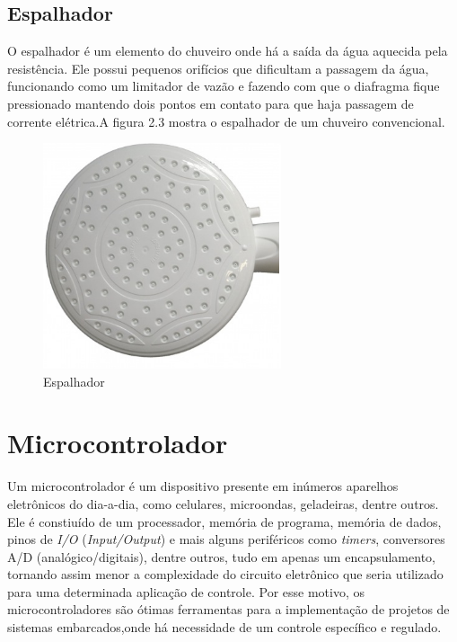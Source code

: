 \subsection{Espalhador}

O espalhador é um elemento do chuveiro onde há a saída da água aquecida pela resistência. Ele possui pequenos orifícios que dificultam a passagem da água, funcionando como um limitador de vazão e fazendo com que o diafragma fique pressionado mantendo dois pontos em contato para que haja passagem de corrente elétrica.A figura 2.3 mostra o espalhador de um chuveiro convencional.


\begin{figure}[!htb]

\center

\includegraphics[width=7cm]{imagens/espalhador.png}

\label{Espalhador}

\caption{Espalhador}

\end{figure}


\section{Microcontrolador}

Um microcontrolador é um dispositivo presente em inúmeros aparelhos eletrônicos do dia-a-dia, como celulares, microondas, geladeiras, dentre outros. Ele é constiuído de um processador, memória de programa, memória de dados, pinos de \textit{I/O} (\textit{Input/Output}) e mais alguns periféricos como \textit{timers}, conversores A/D (analógico/digitais), dentre outros, tudo em apenas um encapsulamento, tornando assim menor a complexidade do circuito eletrônico que seria utilizado para uma determinada aplicação de controle.  Por esse motivo, os microcontroladores são ótimas ferramentas para a implementação de projetos de sistemas embarcados,onde há necessidade de um controle específico e regulado.


